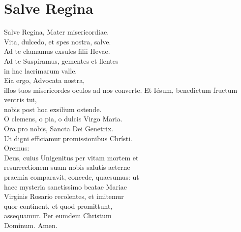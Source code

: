 \documentclass[paper=a5,pagesize=pdftex,fontsize=10pt,headinclude=on,twoside=off]{scrbook}
\begin{document}
\section{Salve Regina}
\begin{scripture}
  \begin{poetry}
    Salve Regina, Mater misericordiae.\\
    Vita, dulcedo, et spes nostra, salve.\\
    Ad te clamamus exsules filii Hevae.\\
    Ad te Suspiramus, gementes et flentes\\
    in hac lacrimarum valle.\\
    Eia ergo, Advocata nostra, \\
    illos tuos misericordes oculos ad nos converte.
    Et Iésum, benedictum fructum ventris tui, \\
    nobis post hoc exsilium ostende.\\
    O clemens, o pia, o dulcis Virgo Maria.\\
    Ora pro nobis, Sancta Dei Genetrix.\\
    Ut digni efficiamur promissionibus Chrísti.\\
    Oremus:\\
    Deus, cuius Unigenitus per vitam mortem et\\
    resurrectionem suam nobis salutis aeterne\\
    praemia comparavit, concede, quaesumus: ut\\
    haec mysteria sanctissimo beatae Mariae\\
    Virginis Rosario recolentes, et imitemur\\
    quor continent, et quod promittunt,\\
    assequamur. Per eumdem Christum\\
    Dominum. Amen.\\
  \end{poetry}
\end{scripture}
\end{document}
